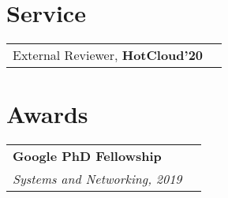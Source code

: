 \documentclass[margin,line]{res}
\begin{document}
\begin{resume}


\section{\sc Service}
\begin{tabular}{@{}p{5.5in}p{4in}}
External Reviewer, {\bf HotCloud'20}\\
\end{tabular}

\section{\sc Awards}
\begin{tabular}{@{}p{5.5in}p{4in}}
{\bf Google PhD Fellowship}\\
{\small\em Systems and Networking, 2019}\\
\end{tabular}

\end{resume}
\end{document}
